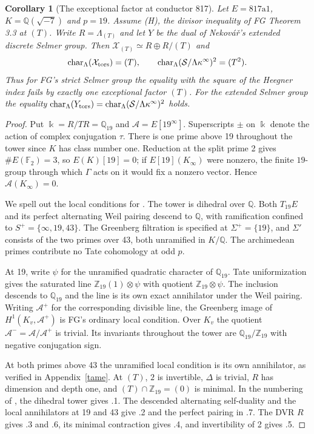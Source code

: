 \documentclass[11pt]{article}
\newtheorem{corollary}[theorem]{Corollary}
\newcommand{\Q}{\mathbb Q}
\newcommand{\Z}{\mathbb Z}
\newcommand{\F}{\mathbb F}
\begin{document}
\begin{corollary}[The exceptional factor at conductor 817]\label{exact}
Let $E=817\mathrm a1$, $K=\Q(\sqrt{-7})$ and $p=19$. Assume (H), the divisor inequality of FG Theorem 3.3 at $(T)$. Write $R=\Lambda_{(T)}$ and let $Y$ be the dual of Nekov\'a\v r's extended discrete Selmer group. Then $\mathcal X_{(T)}\simeq R\oplus R/(T)$ and
\[
\operatorname{char}_\Lambda(\mathcal X_{\rm tors})=(T),\qquad
\operatorname{char}_\Lambda(\mathcal S/\Lambda\kappa^\infty)^2=(T^2).
\]
Thus for FG's strict Selmer group the equality with the square of the Heegner index fails by exactly one exceptional factor $(T)$. For the extended Selmer group the equality
$\operatorname{char}_\Lambda(Y_{\rm tors})=\operatorname{char}_\Lambda(\mathcal S/\Lambda\kappa^\infty)^2$ holds.
\end{corollary}
\begin{proof}
Put $\Bbbk=R/TR=\Q_{19}$ and $\mathcal A=E[19^\infty]$. Superscripts $\pm$ on $\Bbbk$ denote the action of complex conjugation $\tau$. There is one prime above 19 throughout the tower since $K$ has class number one. Reduction at the split prime 2 gives $\#E(\F_2)=3$, so $E(K)[19]=0$; if $E[19](K_\infty)$ were nonzero, the finite $19$-group through which $\Gamma$ acts on it would fix a nonzero vector. Hence $\mathcal A(K_\infty)=0$.

We spell out the local conditions for \cite[10.3.5.1.1--5, 10.7.11.1--7]{Nek}. The tower is dihedral over $\Q$. Both $T_{19}E$ and its perfect alternating Weil pairing descend to $\Q$, with ramification confined to $S^+=\{\infty,19,43\}$. The Greenberg filtration is specified at $\Sigma^+=\{19\}$, and $\Sigma'$ consists of the two primes over 43, both unramified in $K/\Q$. The archimedean primes contribute no Tate cohomology at odd $p$.

At 19, write $\psi$ for the unramified quadratic character of $\Q_{19}$. Tate uniformization gives the saturated line $\Z_{19}(1)\otimes\psi$ with quotient $\Z_{19}\otimes\psi$. The inclusion descends to $\Q_{19}$ and the line is its own exact annihilator under the Weil pairing. Writing $\mathcal A^+$ for the corresponding divisible line, the Greenberg image of $H^1(K_v,\mathcal A^+)$ is FG's ordinary local condition. Over $K_v$ the quotient $\mathcal A^-=\mathcal A/\mathcal A^+$ is trivial. Its invariants throughout the tower are $\Q_{19}/\Z_{19}$ with negative conjugation sign.

At both primes above 43 the unramified local condition is its own annihilator, as verified in Appendix~\ref{tame}. At $(T)$, $2$ is invertible, $\Delta$ is trivial, $R$ has dimension and depth one, and $(T)\cap\Z_{19}=(0)$ is minimal. In the numbering of \cite[10.7.11]{Nek}, the dihedral tower gives .1. The descended alternating self-duality and the local annihilators at 19 and 43 give .2 and the perfect pairing in .7. The DVR $R$ gives .3 and .6, its minimal contraction gives .4, and invertibility of 2 gives .5.


\end{proof}
\end{document}
